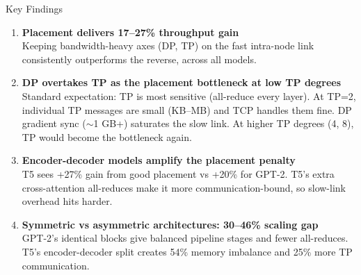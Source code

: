 \documentclass[10pt, aspectratio=169]{beamer}
\begin{document}
\begin{frame}{Key Findings}
  \begin{enumerate}
    \item \textbf{Placement delivers 17--27\% throughput gain}\\
    Keeping bandwidth-heavy axes (DP, TP) on the fast intra-node link consistently outperforms the reverse, across all models.

    \vspace{0.3em}
    \item \textbf{DP overtakes TP as the placement bottleneck at low TP degrees}\\
    Standard expectation: TP is most sensitive (all-reduce every layer).
    At TP=2, individual TP messages are small (KB--MB) and TCP handles them fine.
    DP gradient sync ($\sim$1 GB+) saturates the slow link.
    At higher TP degrees (4, 8), TP would become the bottleneck again.

    \vspace{0.3em}
    \item \textbf{Encoder-decoder models amplify the placement penalty}\\
    T5 sees +27\% gain from good placement vs +20\% for GPT-2. T5's extra cross-attention all-reduces make it more communication-bound, so slow-link overhead hits harder.

    \vspace{0.3em}
    \item \textbf{Symmetric vs asymmetric architectures: 30--46\% scaling gap}\\
    GPT-2's identical blocks give balanced pipeline stages and fewer all-reduces.
    T5's encoder-decoder split creates 54\% memory imbalance and 25\% more TP communication.
  \end{enumerate}
\end{frame}

\end{document}

